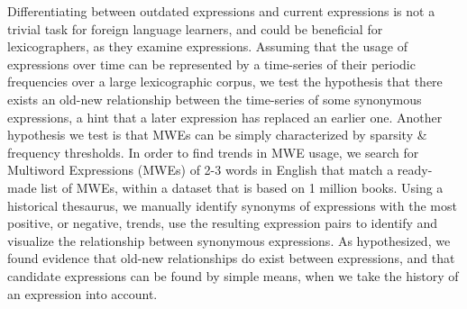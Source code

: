 Differentiating between outdated expressions and current expressions is not a trivial task for foreign language learners, and could be beneficial for lexicographers, as they examine expressions. Assuming that the usage of expressions over time can be represented by a time-series of their periodic frequencies over a large lexicographic corpus, we test the hypothesis that there exists an old-new relationship between the time-series of some synonymous expressions, a hint that a later expression has replaced an earlier one. Another hypothesis we test is that MWEs can be simply characterized by sparsity \& frequency thresholds. In order to find trends in MWE usage, we search for Multiword Expressions (MWEs) of 2-3 words in English that match a ready-made list of MWEs, within a dataset that is based on 1 million books. Using a historical thesaurus, we manually identify synonyms of expressions with the most positive, or negative, trends, use the resulting expression pairs to identify and visualize the relationship between synonymous expressions. As hypothesized, we found evidence that old-new relationships do exist between expressions, and that candidate expressions can be found by simple means, when we take the history of an expression into account.
